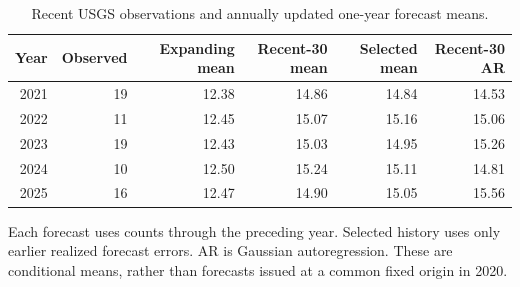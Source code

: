 \begin{table}[!htb]
\centering
\small
\caption{Recent USGS observations and annually updated one-year forecast means.}
\label{tab:recent}
\setlength{\tabcolsep}{4pt}
\begin{tabular}{rrrrrr}
\toprule
Year & Observed & Expanding mean & Recent-30 mean & Selected mean & Recent-30 AR \\
\midrule
2021 & 19 & 12.38 & 14.86 & 14.84 & 14.53 \\
2022 & 11 & 12.45 & 15.07 & 15.16 & 15.06 \\
2023 & 19 & 12.43 & 15.03 & 14.95 & 15.26 \\
2024 & 10 & 12.50 & 15.24 & 15.11 & 14.81 \\
2025 & 16 & 12.47 & 14.90 & 15.05 & 15.56 \\
\bottomrule
\end{tabular}
\par\smallskip
\begin{minipage}{\linewidth}\footnotesize
Each forecast uses counts through the preceding year. Selected history uses only earlier realized forecast errors. AR is Gaussian autoregression. These are conditional means, rather than forecasts issued at a common fixed origin in 2020.
\end{minipage}
\end{table}
